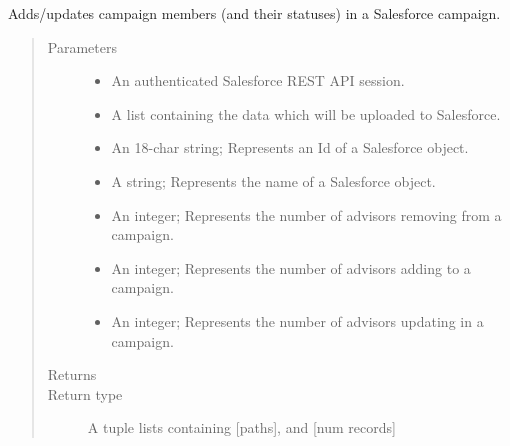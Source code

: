 \documentclass[letterpaper,10pt,english]{sphinxmanual}
\begin{document}

\begin{fulllineitems}
\label{\detokenize{index:ListManagement.utility.processes.cmp_upload}}
Adds/updates campaign members (and their statuses) in a Salesforce campaign.
\begin{quote}\begin{description}
\item[{Parameters}] \leavevmode\begin{itemize}
\item {} 
 \textendash{} An authenticated Salesforce REST API session.

\item {} 
 \textendash{} A list containing the data which will be uploaded to Salesforce.

\item {} 
 \textendash{} An 18-char string; Represents an Id of a Salesforce object.

\item {} 
 \textendash{} A string; Represents the name of a Salesforce object.

\item {} 
 \textendash{} An integer; Represents the number of advisors removing from a campaign.

\item {} 
 \textendash{} An integer; Represents the number of advisors adding to a campaign.

\item {} 
 \textendash{} An integer; Represents the number of advisors updating in a campaign.

\end{itemize}

\item[{Returns}] \leavevmode


\item[{Return type}] \leavevmode
A tuple lists containing {[}paths{]}, and {[}num records{]}

\end{description}\end{quote}

\end{fulllineitems}
\end{document}
